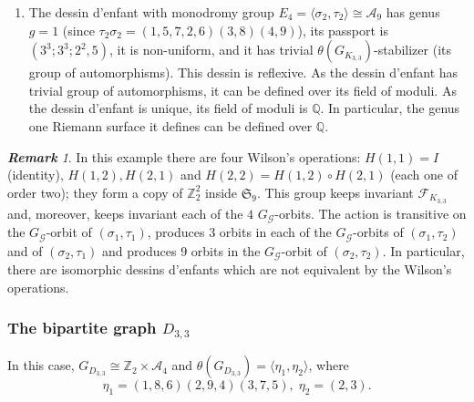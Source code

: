 \documentclass[12pt]{amsart}
\theoremstyle{remark}
\newtheorem{rema}{\bf Remark}
\begin{document}
\begin{enumerate}
\item The dessin d'enfant with monodromy group $E_{4}=\langle \sigma_{2},\tau_{2}\rangle \cong {\mathcal A}_{9}$ has genus $g=1$ (since $\tau_{2}\sigma_{2}=(1,5,7,2,6)(3,8)(4,9)$), its passport is
$(3^3;3^3;2^2,5)$, it  is non-uniform, and it has trivial $\theta(G_{K_{3,3}})$-stabilizer (its group of automorphisms). This dessin is reflexive. As the dessin d'enfant has trivial group of automorphisms, it can be defined over its field of moduli. As the dessin d'enfant is unique, its field of moduli is ${\mathbb Q}$. In particular, the genus one Riemann surface it defines can be defined over ${\mathbb Q}$. 
\end{enumerate}

{\vspace{0.3cm}}
\noindent
\begin{rema}
In this example there are four Wilson's operations: $H(1,1)=I$ (identity), $H(1,2), H(2,1)$ and $H(2,2)=H(1,2)\circ H(2,1)$ (each one of order two); they form a copy of ${\mathbb Z}_{2}^{2}$ inside ${\mathfrak S}_{9}$. This group keeps invariant ${\mathcal F}_{K_{3,3}}$ and, moreover, keeps invariant each of the $4$ $G_{\mathcal G}$-orbits. The action is transitive on the $G_{\mathcal G}$-orbit of $(\sigma_{1},\tau_{1})$, produces $3$ orbits in each of the $G_{\mathcal G}$-orbits of $(\sigma_{1},\tau_{2})$ and of $(\sigma_{2},\tau_{1})$ and produces $9$ orbits in the $G_{\mathcal G}$-orbit of $(\sigma_{2},\tau_{2})$. In particular, there are isomorphic dessins d'enfants which are not equivalent by the Wilson's operations.
\end{rema}

{\vspace{0.3cm}}

\subsubsection{The bipartite graph $D_{3,3}$}
In this case, $G_{D_{3,3}}\cong {\mathbb Z}_{2} \times {\mathcal A}_{4}$ and $\theta(G_{D_{3,3}})=\langle \eta_{1}, \eta_{2} \rangle$,
where $$\eta_{1}=(1,8,6)(2,9,4)(3,7,5),\; \eta_{2}=(2,3).$$
\end{document}
